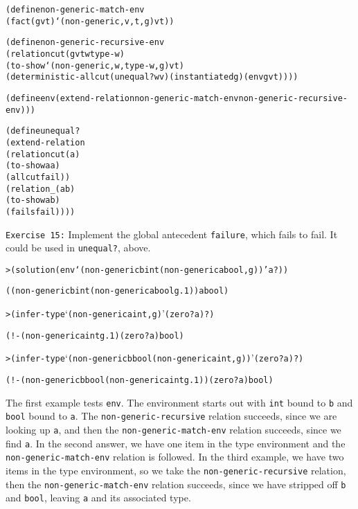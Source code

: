 \begin{alltt}
(define non-generic-match-env
  (fact (g v t) `(non-generic ,v ,t ,g) v t))

(define non-generic-recursive-env
  (relation cut (g v t w type-w)
    (to-show `(non-generic ,w ,type-w ,g) v t)
    (deterministic-all cut (unequal? w v) (instantiated g) (env g v t))))

(define env (extend-relation non-generic-match-env non-generic-recursive-env)))
\end{alltt}

\begin{alltt}
(define unequal?
  (extend-relation
    (relation cut (a)
      (to-show a a)
      (all cut fail))
    (relation _ (a b)
      (to-show a b)
      (fails fail))))
\end{alltt}

\texttt{Exercise 15:} Implement the global antecedent
\texttt{failure}, which fails to fail.  It could be used in
\texttt{unequal?}, above.

\begin{alltt}
> (solution (env `(non-generic b int (non-generic a bool ,g)) 'a ?))

((non-generic b int (non-generic a bool g.1)) a bool)
\end{alltt}

\begin{alltt}
> (infer-type `(non-generic a int ,g) '(zero? a) ?)

(!- (non-generic a int g.1) (zero? a) bool)
\end{alltt}

\begin{alltt}
> (infer-type `(non-generic b bool (non-generic a int ,g)) '(zero? a) ?)

(!- (non-generic b bool (non-generic a int g.1)) (zero? a) bool)
\end{alltt}

The first example tests \texttt{env}.  The environment starts out with
\texttt{int} bound to \texttt{b} and \texttt{bool} bound to
\texttt{a}.  The \texttt{non-generic-recursive} relation succeeds,
since we are looking up \texttt{a}, and then the
\texttt{non-generic-match-env} relation succeeds, since we find
\texttt{a}.  In the second answer, we have one item in the type
environment and the \texttt{non-generic-match-env} relation is
followed. In the third example, we have two items in the type
environment, so we take the \texttt{non-generic-recursive} relation, 
then the \texttt{non-generic-match-env} relation succeeds,
since we have stripped off \texttt{b} and \texttt{bool}, leaving
\texttt{a} and its associated type.

